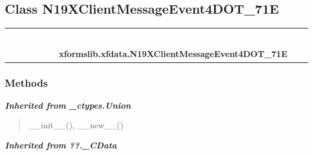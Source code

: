 
\subsection{Class N19XClientMessageEvent4DOT\_71E}

    \label{xformslib:xfdata:N19XClientMessageEvent4DOT_71E}
\begin{tabular}{cccccccccc}
\multicolumn{2}{r}{\settowidth{\BCL}{object}\multirow{2}{\BCL}{object}}
&&
&&
&&
  \\\cline{3-3}
  &&\multicolumn{1}{c|}{}
&&
&&
&&
  \\
\multicolumn{4}{r}{\settowidth{\BCL}{??.\_CData}\multirow{2}{\BCL}{??.\_CData}}
&&
&&
  \\\cline{5-5}
  &&&&\multicolumn{1}{c|}{}
&&
&&
  \\
\multicolumn{6}{r}{\settowidth{\BCL}{\_ctypes.Union}\multirow{2}{\BCL}{\_ctypes.Union}}
&&
  \\\cline{7-7}
  &&&&&&\multicolumn{1}{c|}{}
&&
  \\
&&&&&&\multicolumn{2}{l}{\textbf{xformslib.xfdata.N19XClientMessageEvent4DOT\_71E}}
\end{tabular}



  \subsubsection{Methods}


\large{\textbf{\textit{Inherited from \_ctypes.Union}}}

\begin{quote}
\_\_init\_\_(), \_\_new\_\_()
\end{quote}

\large{\textbf{\textit{Inherited from ??.\_CData}}}


